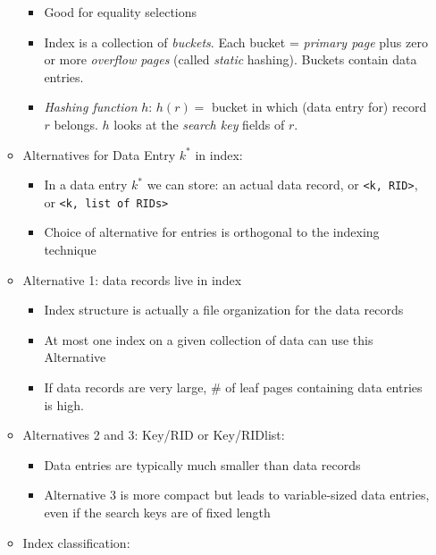 \documentclass[landscape,8pt]{extarticle}
\newcommand{\code}{\lstinline}
\begin{document}
\begin{multicols}{4}
\begin{itemize}
\begin{itemize}
\begin{itemize}
                            \item Good for equality selections
                            \item Index is a collection of \emph{buckets}. Each bucket = \emph{primary page} plus zero or more \emph{overflow pages} (called \emph{static} hashing). Buckets contain data entries.
                            \item \emph{Hashing function} $h$: $h(r) = $ bucket in which (data entry for) record $r$ belongs. $h$ looks at the \emph{search key} fields of $r$.
                        \end{itemize}
                  \item Alternatives for Data Entry $k^*$ in index:
                        \begin{itemize}
                            \item In a data entry $k^*$ we can store: an actual data record, or \code{<k, RID>}, or \code{<k, list of RIDs>}
                            \item Choice of alternative for entries is orthogonal to the indexing technique
                        \end{itemize}
                  \item Alternative 1: data records live in index
                        \begin{itemize}
                            \item Index structure is actually a file organization for the data records
                            \item At most one index on a given collection of data can use this Alternative
                            \item If data records are very large, \# of leaf pages containing data entries is high.
                        \end{itemize}
                  \item Alternatives 2 and 3: Key/RID or Key/RIDlist:
                        \begin{itemize}
                            \item Data entries are typically much smaller than data records
                            \item Alternative 3 is more compact but leads to variable-sized data entries, even if the search keys are of fixed length
                        \end{itemize}
                  \item Index classification:

\end{itemize}
\end{itemize}
\end{multicols}
\end{document}
